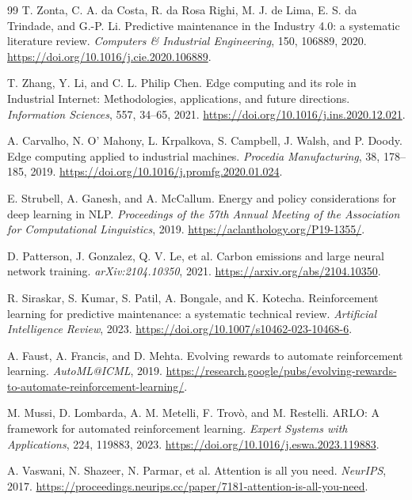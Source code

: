 \documentclass[11pt]{article}
\begin{document}
\begin{thebibliography}{99}
 T. Zonta, C. A. da Costa, R. da Rosa Righi, M. J. de Lima, E. S. da Trindade, and G.-P. Li. Predictive maintenance in the Industry 4.0: a systematic literature review. \textit{Computers \& Industrial Engineering}, 150, 106889, 2020. \url{https://doi.org/10.1016/j.cie.2020.106889}.

 T. Zhang, Y. Li, and C. L. Philip Chen. Edge computing and its role in Industrial Internet: Methodologies, applications, and future directions. \textit{Information Sciences}, 557, 34--65, 2021. \url{https://doi.org/10.1016/j.ins.2020.12.021}.

 A. Carvalho, N. O' Mahony, L. Krpalkova, S. Campbell, J. Walsh, and P. Doody. Edge computing applied to industrial machines. \textit{Procedia Manufacturing}, 38, 178--185, 2019. \url{https://doi.org/10.1016/j.promfg.2020.01.024}.

 E. Strubell, A. Ganesh, and A. McCallum. Energy and policy considerations for deep learning in NLP. \textit{Proceedings of the 57th Annual Meeting of the Association for Computational Linguistics}, 2019. \url{https://aclanthology.org/P19-1355/}.

 D. Patterson, J. Gonzalez, Q. V. Le, et al. Carbon emissions and large neural network training. \textit{arXiv:2104.10350}, 2021. \url{https://arxiv.org/abs/2104.10350}.

 R. Siraskar, S. Kumar, S. Patil, A. Bongale, and K. Kotecha. Reinforcement learning for predictive maintenance: a systematic technical review. \textit{Artificial Intelligence Review}, 2023. \url{https://doi.org/10.1007/s10462-023-10468-6}.

 A. Faust, A. Francis, and D. Mehta. Evolving rewards to automate reinforcement learning. \textit{AutoML@ICML}, 2019. \url{https://research.google/pubs/evolving-rewards-to-automate-reinforcement-learning/}.

 M. Mussi, D. Lombarda, A. M. Metelli, F. Trov\`o, and M. Restelli. ARLO: A framework for automated reinforcement learning. \textit{Expert Systems with Applications}, 224, 119883, 2023. \url{https://doi.org/10.1016/j.eswa.2023.119883}.

 A. Vaswani, N. Shazeer, N. Parmar, et al. Attention is all you need. \textit{NeurIPS}, 2017. \url{https://proceedings.neurips.cc/paper/7181-attention-is-all-you-need}.


\end{thebibliography}
\end{document}
